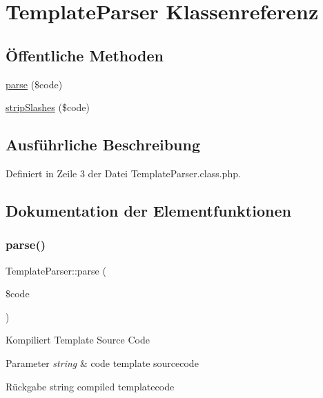 \hypertarget{class_template_parser}{}\section{Template\+Parser Klassenreferenz}
\label{class_template_parser}
\subsection*{Öffentliche Methoden}
\begin{DoxyCompactItemize}
\item 
\mbox{\hyperlink{class_template_parser_a6d5439b906b536202205cb7a4cc29eea}{parse}} (\$code)
\item 
\mbox{\hyperlink{class_template_parser_a0cf9f9ca6876c4460a8a6cc1c2d6e97f}{strip\+Slashes}} (\$code)
\end{DoxyCompactItemize}


\subsection{Ausführliche Beschreibung}


Definiert in Zeile 3 der Datei Template\+Parser.\+class.\+php.



\subsection{Dokumentation der Elementfunktionen}
\mbox{\label{class_template_parser_a6d5439b906b536202205cb7a4cc29eea}} 
\subsubsection{\texorpdfstring{parse()}{parse()}}
{\footnotesize\ttfamily Template\+Parser\+::parse (\begin{DoxyParamCaption}\item[{}]{\$code }\end{DoxyParamCaption})}

Kompiliert Template Source Code


\begin{DoxyParams}{Parameter}
{\em string} & code template sourcecode \\
\hline
\end{DoxyParams}
\begin{DoxyReturn}{Rückgabe}
string compiled templatecode 
\end{DoxyReturn}


